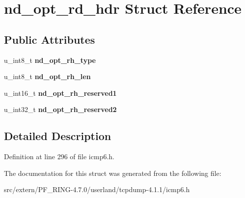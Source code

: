 \hypertarget{structnd__opt__rd__hdr}{
\section{nd\_\-opt\_\-rd\_\-hdr Struct Reference}
\label{structnd__opt__rd__hdr}
}
\subsection*{Public Attributes}
\begin{DoxyCompactItemize}
\item 
\hypertarget{structnd__opt__rd__hdr_a79f5e67a950613496edba1a3becb61f3}{
u\_\-int8\_\-t {\bfseries nd\_\-opt\_\-rh\_\-type}}
\label{structnd__opt__rd__hdr_a79f5e67a950613496edba1a3becb61f3}

\item 
\hypertarget{structnd__opt__rd__hdr_a44845c8642ee7f6b16d9a74a8ecdb955}{
u\_\-int8\_\-t {\bfseries nd\_\-opt\_\-rh\_\-len}}
\label{structnd__opt__rd__hdr_a44845c8642ee7f6b16d9a74a8ecdb955}

\item 
\hypertarget{structnd__opt__rd__hdr_a892b19011c6f04b8ed6b76592342fbd3}{
u\_\-int16\_\-t {\bfseries nd\_\-opt\_\-rh\_\-reserved1}}
\label{structnd__opt__rd__hdr_a892b19011c6f04b8ed6b76592342fbd3}

\item 
\hypertarget{structnd__opt__rd__hdr_adf9b83cb07eaf1735611cc24c20abe86}{
u\_\-int32\_\-t {\bfseries nd\_\-opt\_\-rh\_\-reserved2}}
\label{structnd__opt__rd__hdr_adf9b83cb07eaf1735611cc24c20abe86}

\end{DoxyCompactItemize}


\subsection{Detailed Description}


Definition at line 296 of file icmp6.h.



The documentation for this struct was generated from the following file:\begin{DoxyCompactItemize}
\item 
src/extern/PF\_\-RING-\/4.7.0/userland/tcpdump-\/4.1.1/icmp6.h\end{DoxyCompactItemize}
